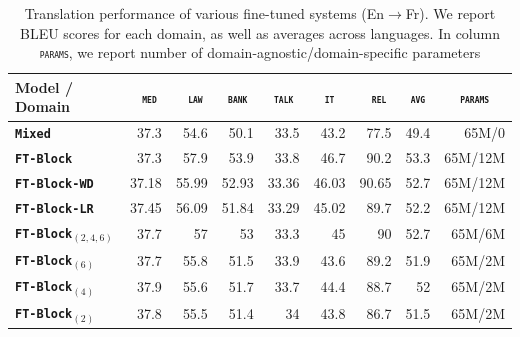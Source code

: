\documentclass[11pt,a4paper]{article}
\newcommand{\fyDone}[1]{\done[FY]\Todo[FY:]{\textcolor{orange}{#1}}}
\newcommand{\domain}[1]{\texttt{\textsc{#1}}}
\newcommand{\system}[1]{\texttt{\textbf{#1}}}
\begin{document}
\begin{table}
  \centering
  \begin{tabular}{|p{3cm}|*{8}{r|}} \hline
    Model / Domain & \multicolumn{1}{c|}{\domain{ med}} & \multicolumn{1}{c|}{\domain{ law}} & \multicolumn{1}{c|}{\domain{bank}} & \multicolumn{1}{c|}{\domain{talk}} & \multicolumn{1}{c|}{\domain{ it }} & \multicolumn{1}{c|}{\domain{ rel}} & \multicolumn{1}{c|}{\domain{avg}} & \multicolumn{1}{c|}{\domain{params}} \\ \hline 
    \system{Mixed}  & 37.3 & 54.6 & 50.1 & 33.5 & 43.2 & 77.5  & 49.4 & 65M/0 \\
    \system{FT-Block}     & 37.3 & 57.9 & 53.9 & 33.8 & 46.7 & 90.2 & 53.3 & 65M/12M\\
    \system{FT-Block-WD}     & 37.18 & 55.99 & 52.93 & 33.36 & 46.03 & 90.65 & 52.7 & 65M/12M \\
   \system{FT-Block-LR}     & 37.45 & 56.09 & 51.84 & 33.29 & 45.02 & 89.7 & 52.2 & 65M/12M \\  
    \system{FT-Block$_{(2,4,6)}$}     & 37.7 & 57 & 53 & 33.3 & 45 & 90 & 52.7 & 65M/6M\\
    \system{FT-Block$_{(6)}$}     & 37.7 & 55.8 & 51.5 & 33.9 & 43.6 & 89.2 & 51.9 & 65M/2M \\
    \system{FT-Block$_{(4)}$}     & 37.9 & 55.6 & 51.7 & 33.7 & 44.4 & 88.7 & 52 & 65M/2M\\
   \system{FT-Block$_{(2)}$}     & 37.8 & 55.5 & 51.4 & 34 & 43.8 & 86.7 & 51.5 & 65M/2M\\
     \hline
  \end{tabular}
  \caption{Translation performance of various fine-tuned systems (En$\rightarrow$Fr). We report BLEU scores for each domain, as well as averages across languages. In column \domain{params}, we report number of domain-agnostic/domain-specific parameters} \fyDone{Boldface ?}
  \label{tab:performance-en-fr-pos-reg}
\end{table}
\end{document}
